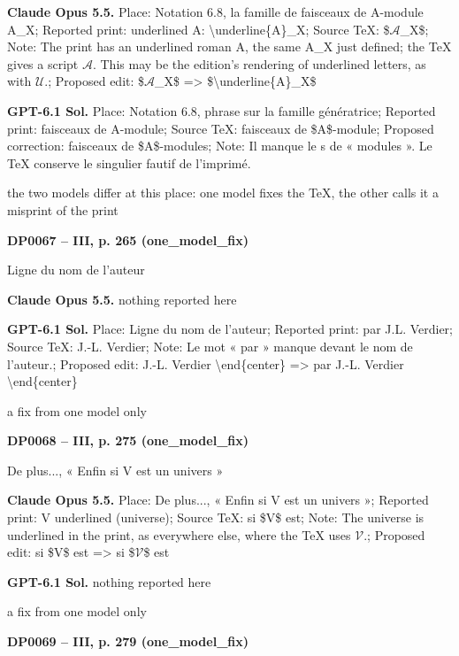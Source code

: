 \textbf{Claude Opus 5.5.} Place: Notation 6.8, la famille de faisceaux de A-module A\_X; Reported print: underlined A: \textbackslash{}underline\{A\}\_X; Source TeX: \$\ensuremath{𝒜}\_X\$; Note: The print has an underlined roman A, the same A\_X just defined; the TeX gives a script \ensuremath{𝒜}. This may be the edition's rendering of underlined letters, as with \ensuremath{𝒰}.; Proposed edit: \$\ensuremath{𝒜}\_X\$ =\allowbreak > \$\textbackslash{}underline\{A\}\_X\$\par
\textbf{GPT-6.1 Sol.} Place: Notation 6.8, phrase sur la famille génératrice; Reported print: faisceaux de A-module; Source TeX: faisceaux de \$A\$-module; Proposed correction: faisceaux de \$A\$-modules; Note: Il manque le s de « modules ». Le TeX conserve le singulier fautif de l'imprimé.\par
the two models differ at this place: one model fixes the TeX, the other calls it a misprint of the print\par
\par\noindent\hypertarget{DP0067}{}\textbf{DP0067 -- III, p. 265 (one\_model\_fix)}\par
Ligne du nom de l’auteur\par
\textbf{Claude Opus 5.5.} nothing reported here\par
\textbf{GPT-6.1 Sol.} Place: Ligne du nom de l’auteur; Reported print: par J.L. Verdier; Source TeX: J.-L. Verdier; Note: Le mot « par » manque devant le nom de l’auteur.; Proposed edit: J.-L. Verdier \textbackslash{}end\{center\} =\allowbreak > par J.-L. Verdier \textbackslash{}end\{center\}\par
a fix from one model only\par
\par\noindent\hypertarget{DP0068}{}\textbf{DP0068 -- III, p. 275 (one\_model\_fix)}\par
De plus..., « Enfin si V est un univers »\par
\textbf{Claude Opus 5.5.} Place: De plus..., « Enfin si V est un univers »; Reported print: V underlined (universe); Source TeX: si \$V\$ est; Note: The universe is underlined in the print, as everywhere else, where the TeX uses \ensuremath{𝒱}.; Proposed edit: si \$V\$ est =\allowbreak > si \$\ensuremath{𝒱}\$ est\par
\textbf{GPT-6.1 Sol.} nothing reported here\par
a fix from one model only\par
\par\noindent\hypertarget{DP0069}{}\textbf{DP0069 -- III, p. 279 (one\_model\_fix)}\par
